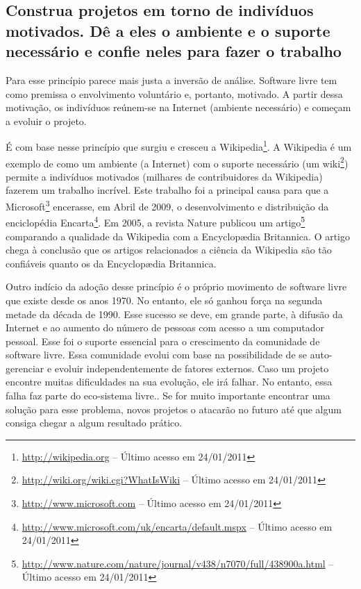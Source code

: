 \subsection[Trabalhar com indivíduos motivados]{ Construa projetos em
  torno de indivíduos motivados.  Dê a eles o ambiente e o suporte
  necessário e confie neles para fazer o trabalho}

Para esse princípio parece mais justa a inversão de análise. Software
livre tem como premissa o envolvimento voluntário e, portanto,
motivado. A partir dessa motivação, os indivíduos reúnem-se na
Internet (ambiente necessário) e começam a evoluir o projeto.

É com base nesse princípio que surgiu e cresceu a
Wikipedia\footnote{\url{http://wikipedia.org} -- Último acesso em
  24/01/2011}. A Wikipedia é um exemplo de como um ambiente (a
Internet) com o suporte necessário (um
wiki\footnote{\url{http://wiki.org/wiki.cgi?WhatIsWiki} -- Último
  acesso em 24/01/2011}) permite a indivíduos motivados (milhares de
contribuidores da Wikipedia) fazerem um trabalho incrível. Este
trabalho foi a principal causa para que a
Microsoft\footnote{\url{http://www.microsoft.com} -- Último acesso em
  24/01/2011} encerasse, em Abril de 2009, o desenvolvimento e
distribuição da enciclopédia
Encarta\footnote{\url{http://www.microsoft.com/uk/encarta/default.mspx}
  -- Último acesso em 24/01/2011}. Em 2005, a revista Nature publicou
um
artigo\footnote{\url{http://www.nature.com/nature/journal/v438/n7070/full/438900a.html}
  -- Último acesso em 24/01/2011} comparando a qualidade da Wikipedia
com a Encyclop{\ae}dia Britannica. O artigo chega à conclusão que os
artigos relacionados a ciência da Wikipedia são tão confiáveis quanto
os da Encyclop{\ae}dia Britannica.

Outro indício da adoção desse princípio é o próprio movimento de
software livre que existe desde os anos 1970. No entanto, ele só
ganhou força na segunda metade da década de 1990. Esse sucesso se
deve, em grande parte, à difusão da Internet e ao aumento do número de
pessoas com acesso a um computador pessoal. Esse foi o suporte
essencial para o crescimento da comunidade de software livre. Essa
comunidade evolui com base na possibilidade de se auto-gerenciar e
evoluir independentemente de fatores externos.  Caso um projeto
encontre muitas dificuldades na sua evolução, ele irá falhar. No
entanto, essa falha faz parte do eco-sistema livre.. Se for muito
importante encontrar uma solução para esse problema, novos projetos o
atacarão no futuro até que algum consiga chegar a algum resultado
prático.

